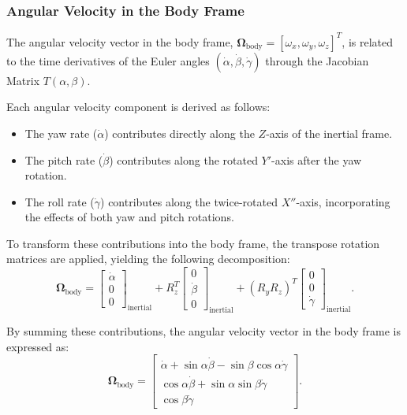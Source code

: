 \documentclass[12pt]{article}
\begin{document}
\subsubsection{Angular Velocity in the Body Frame}

The angular velocity vector in the body frame, \(\boldsymbol{\Omega}_{\text{body}} = [\omega_x, \omega_y, \omega_z]^T\), is related to the time derivatives of the Euler angles \((\dot{\alpha}, \dot{\beta}, \dot{\gamma})\) through the Jacobian Matrix \(T(\alpha, \beta)\). 

Each angular velocity component is derived as follows:
\begin{itemize}
    \item The yaw rate (\(\dot{\alpha}\)) contributes directly along the \(Z\)-axis of the inertial frame.
    \item The pitch rate (\(\dot{\beta}\)) contributes along the rotated \(Y'\)-axis after the yaw rotation.
    \item The roll rate (\(\dot{\gamma}\)) contributes along the twice-rotated \(X''\)-axis, incorporating the effects of both yaw and pitch rotations.
\end{itemize}

To transform these contributions into the body frame, the transpose rotation matrices are applied, yielding the following decomposition:
\begin{equation}
\label{eq:omega_body_decomposition}
\boldsymbol{\Omega}_{\text{body}} =
\begin{bmatrix}
\dot{\alpha} \\
0 \\
0
\end{bmatrix}_{\text{inertial}}
+ R_z^T
\begin{bmatrix}
0 \\
\dot{\beta} \\
0
\end{bmatrix}_{\text{inertial}}
+ (R_y R_z)^T
\begin{bmatrix}
0 \\
0 \\
\dot{\gamma}
\end{bmatrix}_{\text{inertial}}.
\end{equation}

By summing these contributions, the angular velocity vector in the body frame is expressed as:
\begin{equation}
\label{eq:omega_body_expanded}
\boldsymbol{\Omega}_{\text{body}} =
\begin{bmatrix}
\dot{\alpha} + \sin\alpha \dot{\beta} - \sin\beta \cos\alpha \dot{\gamma} \\
\cos\alpha \dot{\beta} + \sin\alpha \sin\beta \dot{\gamma} \\
\cos\beta \dot{\gamma}
\end{bmatrix}.
\end{equation}
\end{document}
